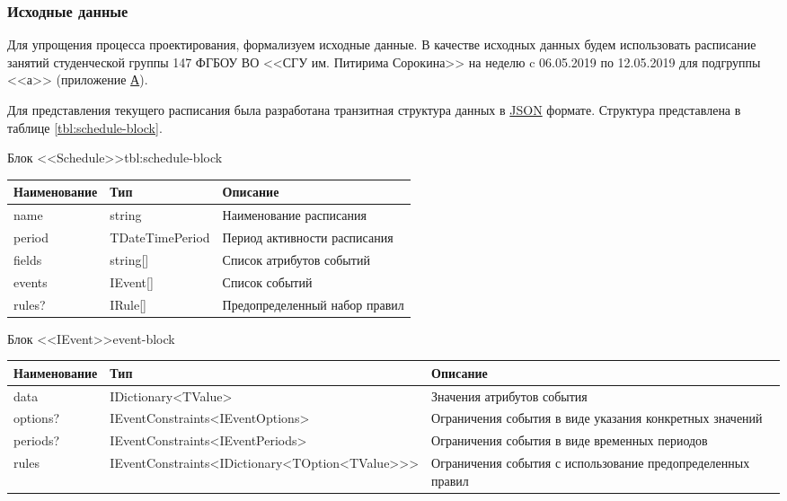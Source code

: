 \subsubsection{Исходные данные}

Для упрощения процесса проектирования, формализуем исходные данные.
В качестве исходных данных будем использовать расписание занятий студенческой группы 147 ФГБОУ ВО <<СГУ им. Питирима Сорокина>> на неделю c 06.05.2019 по 12.05.2019 для подгруппы <<а>> (приложение \hyperlink{app:A}{А}).

Для представления текущего расписания была разработана транзитная структура данных в \hyperlink{json}{JSON} формате.
Структура представлена в таблице \ref{tbl:schedule-block}.

\begin{tbl}{Блок <<Schedule>>}{tbl:schedule-block}
  \begin{tabularx}{\textwidth}{| p{3cm} | p{3cm} | X |}
  \hline Наименование & Тип             & Описание                      \\
  \hline name         & string          & Наименование расписания       \\
  \hline period       & TDateTimePeriod & Период активности расписания  \\
  \hline fields       & string[]        & Список атрибутов событий      \\
  \hline events       & IEvent[]        & Список событий                \\
  \hline rules?       & IRule[]         & Предопределенный набор правил \\
  \hline
  \end{tabularx}
\end{tbl}

\begin{tbl}{Блок <<IEvent>>}{event-block}
  \begin{tabularx}{\textwidth}{| p{3cm} | p{6cm} | X |}
  \hline Наименование & Тип                                                          & Описание                                                    \\
  \hline data         & IDictionary<TValue>                                          & Значения атрибутов события                                  \\
  \hline options?     & IEventConstraints<IEventOptions>                             & Ограничения события в виде указания конкретных значений     \\
  \hline periods?     & IEventConstraints<IEventPeriods>                             & Ограничения события в виде временных периодов               \\
  \hline rules        & IEventConstraints\newline <IDictionary<TOption<TValue>{}>{}> & Ограничения события с использование предопределенных правил \\
  \hline
  \end{tabularx}
\end{tbl}

